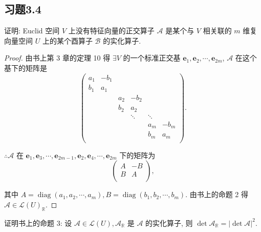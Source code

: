 \documentclass{ctexart}
\begin{document}
\subsection{习题3.4}
\begin{exercise}[4.1]
    证明: Euclid 空间 $V$ 上没有特征向量的正交算子 $\mathcal{A}$ 是某个与 $V$ 相关联的 $m$ 维复向量空间 $U$ 上的某个酉算子 $\mathcal{B}$ 的实化算子.
\end{exercise}
\begin{proof}
    由书上第 3 章的定理 10 得 $\exists V$ 的一个标准正交基 $\boldsymbol{e}_1,\boldsymbol{e}_2,\cdots,\boldsymbol{e}_{2m}$, $\mathcal{A}$ 在这个基下的矩阵是
    \[\begin{pmatrix}
        a_1 & -b_1 \\
        b_1 & a_1 \\
        && a_2 & -b_2 \\
        && b_2 & a_2 \\
        &&& \ddots & \ddots \\
        &&&& a_m & -b_m \\
        &&&& b_m & a_m \\
    \end{pmatrix}.\]

    $\therefore\mathcal{A}$ 在 $\boldsymbol{e}_1,\boldsymbol{e}_3,\cdots,\boldsymbol{e}_{2m-1},\boldsymbol{e}_2,\boldsymbol{e}_4,\cdots,\boldsymbol{e}_{2m}$ 下的矩阵为
    \[\begin{pmatrix}
        A & -B \\
        B & A \\
    \end{pmatrix},\]

    其中 $A=\operatorname{diag}(a_1,a_2,\cdots,a_m),B=\operatorname{diag}(b_1,b_2,\cdots,b_m)$. 由书上的命题 2 得 $\mathcal{A}\in\mathcal{L}(U)_\mathbb{R}$.
\end{proof}
\begin{exercise}[4.2]
    证明书上的命题 3: 设 $\mathcal{A}\in\mathcal{L}(U),\mathcal{A}_\mathbb{R}$ 是 $\mathcal{A}$ 的实化算子, 则 $\det\mathcal{A}_\mathbb{R}=|\det\mathcal{A}|^2$.
\end{exercise}
\end{document}
